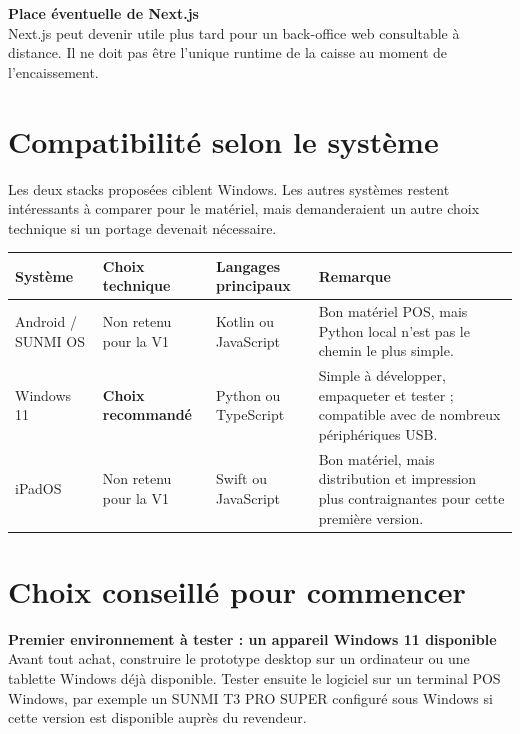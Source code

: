 \documentclass[11pt,a4paper]{article}
\begin{document}
\vspace{4pt}
\begin{tcolorbox}[
  colback=softblue,
  colframe=secondary,
  boxrule=0.55pt,
  arc=2pt,
  left=8pt,right=8pt,top=6pt,bottom=6pt
]
\textbf{Place éventuelle de Next.js}\\
Next.js peut devenir utile plus tard pour un back-office web consultable à distance. Il ne doit
pas être l'unique runtime de la caisse au moment de l'encaissement.
\end{tcolorbox}

\section{Compatibilité selon le système}

Les deux stacks proposées ciblent Windows. Les autres systèmes restent intéressants à comparer
pour le matériel, mais demanderaient un autre choix technique si un portage devenait nécessaire.

\begin{tabularx}{\textwidth}{L{2.45cm} L{3.15cm} L{3.35cm} Y}
  \toprule
  \color{white}\textbf{Système} &
  \color{white}\textbf{Choix technique} &
  \color{white}\textbf{Langages principaux} &
  \color{white}\textbf{Remarque} \\
  \midrule
  Android / SUNMI OS &
  Non retenu pour la V1 &
  Kotlin ou JavaScript &
  Bon matériel POS, mais Python local n'est pas le chemin le plus simple. \\
  Windows 11 &
  \textbf{Choix recommandé} &
  Python ou TypeScript &
  Simple à développer, empaqueter et tester ; compatible avec de nombreux périphériques USB. \\
  iPadOS &
  Non retenu pour la V1 &
  Swift ou JavaScript &
  Bon matériel, mais distribution et impression plus contraignantes pour cette première version. \\
  \bottomrule
\end{tabularx}

\section{Choix conseillé pour commencer}

\begin{tcolorbox}[
  colback=softblue,
  colframe=secondary,
  boxrule=0.55pt,
  arc=2pt,
  left=8pt,right=8pt,top=7pt,bottom=7pt
]
\textbf{\color{primary}Premier environnement à tester : un appareil Windows 11 disponible}\\
Avant tout achat, construire le prototype desktop sur un ordinateur ou une tablette Windows déjà
disponible. Tester ensuite le logiciel sur un terminal POS Windows, par exemple un SUNMI T3 PRO
SUPER configuré sous Windows si cette version est disponible auprès du revendeur.
\end{tcolorbox}
\end{document}
